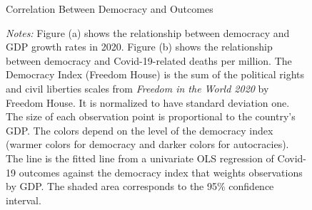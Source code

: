 \begin{figure}[!htbp]
\centering
\caption{Correlation Between Democracy and Outcomes}\label{fig:ols}
\captionsetup{width=0.8\textwidth}
\centering
  
  \caption*{\textit{Notes:} Figure (a) shows the relationship between democracy and GDP growth rates in 2020. Figure (b) shows the relationship between democracy and Covid-19-related deaths per million. The Democracy Index (Freedom House) is the sum of the political rights and civil liberties scales from \emph{Freedom in the World 2020} by Freedom House. It is normalized to have standard deviation one. The size of each observation point is proportional to the country's GDP. The colors depend on the level of the democracy index (warmer colors for democracy and darker colors for autocracies). The line is the fitted line from a univariate OLS regression of Covid-19 outcomes against the democracy index that weights observations by GDP. The shaded area corresponds to the 95\% confidence interval.}
\end{figure}
